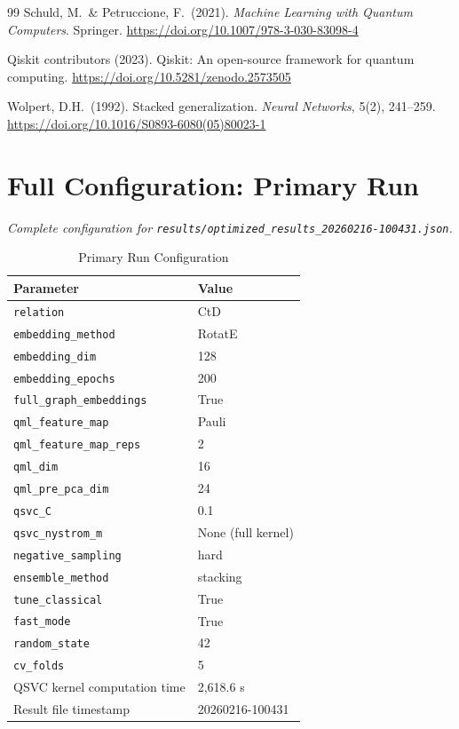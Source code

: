 \documentclass[twocolumn,10pt]{article}
\begin{document}
\begin{thebibliography}{99}
Schuld, M.\ \& Petruccione, F.\ (2021).
\textit{Machine Learning with Quantum Computers}.
Springer.
\url{https://doi.org/10.1007/978-3-030-83098-4}

Qiskit contributors (2023).
Qiskit: An open-source framework for quantum computing.
\url{https://doi.org/10.5281/zenodo.2573505}

Wolpert, D.H.\ (1992).
Stacked generalization.
\textit{Neural Networks}, 5(2), 241--259.
\url{https://doi.org/10.1016/S0893-6080(05)80023-1}

\end{thebibliography}


\appendix

\section{Full Configuration: Primary Run}
\label{app:primary_config}

\textit{Complete configuration for \texttt{results/optimized\_results\_20260216-100431.json}.}

\begin{table}[t]
\centering
\caption{Primary Run Configuration}
\label{tab:config_primary}
\begin{tabular}{@{}ll@{}}
\toprule
\textbf{Parameter} & \textbf{Value} \\
\midrule
\texttt{relation} & CtD \\
\texttt{embedding\_method} & RotatE \\
\texttt{embedding\_dim} & 128 \\
\texttt{embedding\_epochs} & 200 \\
\texttt{full\_graph\_embeddings} & True \\
\texttt{qml\_feature\_map} & Pauli \\
\texttt{qml\_feature\_map\_reps} & 2 \\
\texttt{qml\_dim} & 16 \\
\texttt{qml\_pre\_pca\_dim} & 24 \\
\texttt{qsvc\_C} & 0.1 \\
\texttt{qsvc\_nystrom\_m} & None (full kernel) \\
\texttt{negative\_sampling} & hard \\
\texttt{ensemble\_method} & stacking \\
\texttt{tune\_classical} & True \\
\texttt{fast\_mode} & True \\
\texttt{random\_state} & 42 \\
\texttt{cv\_folds} & 5 \\
QSVC kernel computation time & 2,618.6 s \\
Result file timestamp & 20260216-100431 \\
\bottomrule
\end{tabular}
\end{table}
\end{document}
